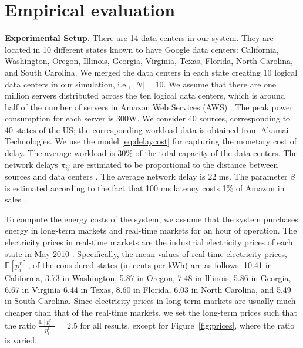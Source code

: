 \section{Empirical evaluation}
\label{sec:caseStudy}


\textbf{Experimental Setup.} There are 14 data centers in our system. They are located in 10
different states known to have Google data centers: California,
Washington, Oregon, Illinois, Georgia, Virginia, Texas, Florida, North
Carolina, and South Carolina. We merged the data centers in each state
creating 10 logical data centers in our simulation, i.e., $|N|=10$. We
assume that there are one million servers distributed across the ten
logical data centers, which is around half of the
number of servers in Amazon Web Services (AWS)
{\cite{AWSServers}}. The peak power consumption for each server is
300W.
We consider 40 sources, corresponding to 40 states of the US; the
corresponding workload data is obtained from Akamai Technologies. We
use the model \eqref{eq:delaycost} for capturing the monetary cost of
delay. The average workload is 30\% of the total capacity of the data
centers. The network delays $\pi_{ij}$ are estimated to be
proportional to the distance between sources and data centers
\cite{ATTNetworkLatency}. The average network delay is $22$ ms.
The parameter $\beta$ is estimated according to the fact that 100
ms latency costs 1\% of Amazon in sales \cite{liddle2008amazon}.



To compute the energy costs of the system, we assume that the system
purchases energy in long-term markets and real-time markets for an
hour of operation. The electricity prices in real-time markets are the
industrial electricity prices of each state in May 2010
\cite{eia2015}. Specifically, the mean values of real-time electricity
prices, $\mathbb{E}[p^r_i]$, of the considered states (in cents per
kWh) are as follows: 10.41 in California, 3.73 in Washington, 5.87 in
Oregon, 7.48 in Illinois, 5.86 in Georgia, 6.67 in Virginia 6.44 in
Texas, 8.60 in Florida, 6.03 in North Carolina, and 5.49 in South
Carolina. Since electricity prices in long-term markets are usually
much cheaper than that of the real-time markets, we set the long-term
prices such that the ratio $\frac{\mathbb{E}[p^r_i]}{p^l_i }=2.5$ for
all results, except for Figure~\ref{fig:prices}, where the ratio is
varied.


